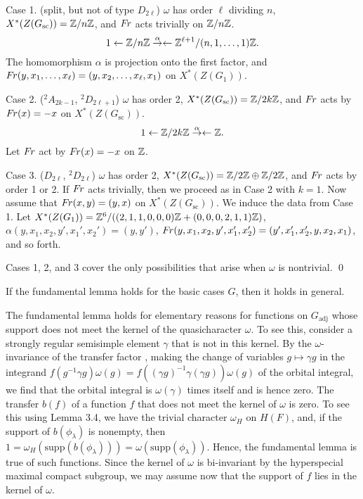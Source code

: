 \bigskip
{Case 1}. (split, but not of type $D_{2\ell}$)
$\omega$ has order $\ell$ dividing $n$, 
$X^*(Z(G_{\text{sc}})) = {\Bbb Z}/n{\Bbb Z}$,
and $\text{$F\hskip-.1em r$}$ acts trivially on ${\Bbb Z}/n{\Bbb Z}$.
$$1\leftarrow {\Bbb Z}/n{\Bbb Z} \overset\alpha\to\leftarrow
 {\Bbb Z}^{\ell+1}/(n,1,\dots,1){\Bbb Z}.$$
The homomorphism $\alpha$ is projection onto the first factor, and
$\text{$F\hskip-.1em r$}(y,x_1,\dots,x_\ell)
 = (y,x_2,\dots,x_\ell,x_1)$ on $X^*(Z(G_1))$.

\bigskip
{ Case 2}. (${}^2A_{2k-1}$,
  ${}^2D_{2\ell+1}$) $\omega$ has order 2, $X^*(Z(G_{\text{sc}})) = {\Bbb Z}/2k{\Bbb Z}
$,
and $\text{$F\hskip-.1em r$}$ acts by $\text{$F\hskip-.1em r$}(x) = -x$ on $X^*(Z(G_{\text{sc}}))$.
$$1\leftarrow {\Bbb Z}/2k{\Bbb Z} \overset\alpha\to\leftarrow {\Bbb Z}.$$
Let $\text{$F\hskip-.1em r$}$ act by
$\text{$F\hskip-.1em r$}(x) = -x$ on ${\Bbb Z}$.

\bigskip
{Case 3}. ($D_{2\ell}$, ${}^2D_{2\ell}$) $\omega$ has order 2,
$X^*(Z(G_{\text{sc}})) = {\Bbb Z}/2{\Bbb Z}\oplus {\Bbb Z}/2{\Bbb Z}$,
and $\text{$F\hskip-.1em r$}$ acts by order 1 or 2.  If $\text{$F\hskip-.1em r$}$ acts trivially, then
we proceed as in Case 2 with $k=1$.  Now assume that
$\text{$F\hskip-.1em r$}(x,y) = (y,x)$ on $X^*(Z(G_{\text{sc}}))$.  
We induce the data from Case 1.  
Let $X^*(Z(G_1)) = {\Bbb Z}^6/((2,1,1,0,0,0){\Bbb Z} +
(0,0,0,2,1,1){\Bbb Z})$, $\alpha(y,x_1,x_2,y',x_1',x_2') = (y,y')$,
$\text{$F\hskip-.1em r$}(y,x_1,x_2,y',x_1',x_2') = (y',x_1',x_2',y,x_2,x_1)$, and so
forth.

Cases 1, 2, and 3 cover the only possibilities that arise when
$\omega$ is nontrivial.
\qed
\enddemo



  If the fundamental lemma holds for
the basic cases $G$,
then it holds in general.
\endproclaim

  The fundamental lemma holds for elementary
reasons for functions on $G_{\text{adj}}$ whose support
does not meet the kernel of the quasicharacter $\omega$.  
To see this, consider
a strongly regular semisimple element $\gamma$ that is not
in this kernel.  By the $\omega$-invariance of the transfer
factor \cite{KS1}, making the change of variables $g\mapsto\gamma g$
in the integrand $f(g^{-1}\gamma g)\omega(g)
    = f((\gamma g)^{-1}\gamma (\gamma g))\omega(g)$
of the orbital integral,
we find that the orbital integral
is $\omega(\gamma)$ times itself and is hence zero.
The transfer $b(f)$ of a function $f$ that does not meet
the kernel of $\omega$ is zero.  
To see this using Lemma 3.4, we have the trivial character $\omega_H$
on $H(F)$, and, if the support of $b(\phi_\lambda)$ is nonempty,
then 
$1 = \omega_H(\text{supp}(b(\phi_\lambda))) = \omega(\text{supp}(\phi_\lambda))$.
Hence, the fundamental lemma is
true of such functions.  Since the kernel of $\omega$ is bi-invariant
by the hyperspecial maximal compact subgroup, we may assume now
that the support of $f$ lies in the kernel of $\omega$.

